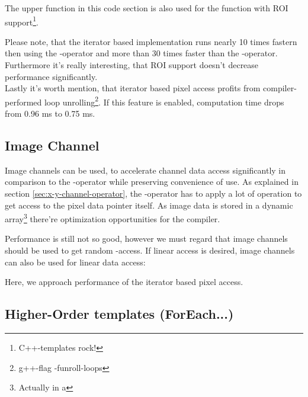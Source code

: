 The upper function in this code section is also used for the function with ROI support\footnote{C++-templates rock!}.


Please note, that the iterator based implementation runs nearly 10 times fastern then using the -operator and more than 30 times faster than the -operator. Furthermore it's really interesting, that ROI support doesn't decrease performance significantly.\\
Lastly it's worth mention, that iterator based pixel access profits from compiler-performed loop unrolling\footnote{g++-flag -funroll-loops}. If this feature is enabled, computation time drops from 0.96 ms to 0.75 ms.

\subsection{Image Channel}
Image channels can be used, to accelerate channel data access significantly in comparison to the -operator while preserving convenience of use. As explained in section \ref{sec:x-y-channel-operator}, the -operator has to apply a lot of operation to get access to the pixel data pointer itself. As image data is stored in a dynamic array\footnote{Actually in a } there're optimization opportunities for the compiler.


Performance is still not so good, however we must regard that image channels should be used to get random -access. If linear access is desired, image channels can also be used for linear data access:


Here, we approach performance of the iterator based pixel access.



\subsection{Higher-Order templates (ForEach...)}
                                   
